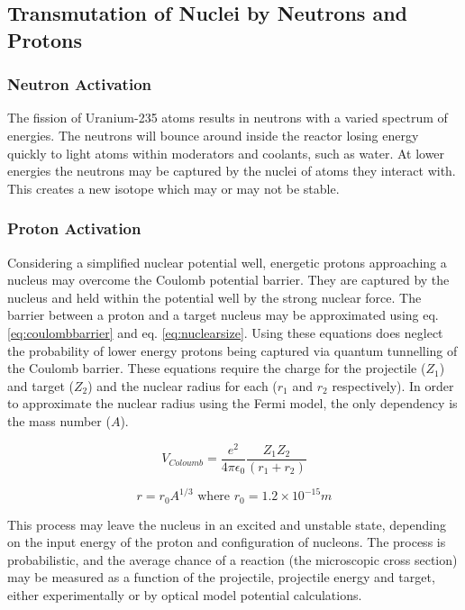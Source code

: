 \subsection{Transmutation of Nuclei by Neutrons and Protons}

\subsubsection{Neutron Activation}

The fission of Uranium-235 atoms results in neutrons with a varied spectrum of energies.  The neutrons will bounce around inside the reactor losing energy quickly to light atoms within moderators and coolants, such as water.  At lower energies the neutrons may be captured by the nuclei of atoms they interact with.  This creates a new isotope which may or may not be stable.



\subsubsection{Proton Activation}
\label{section:protonactivation}

Considering a simplified nuclear potential well, energetic protons approaching a nucleus may overcome the Coulomb potential barrier.  They are captured by the nucleus and held within the potential well by the strong nuclear force.  The barrier between a proton and a target nucleus may be approximated using eq. \ref{eq:coulombbarrier}\cite{coulombhyperphysics} and eq. \ref{eq:nuclearsize}\cite{nuclearsizehyperphysics}.  Using these equations does neglect the probability of lower energy protons being captured via quantum tunnelling of the Coulomb barrier.  These equations require the charge for the projectile ($Z_1$) and target ($Z_2$) and the nuclear radius for each ($r_1$ and $r_2$ respectively).  In order to approximate the nuclear radius using the Fermi model, the only dependency is the mass number ($A$).

\begin{equation}
V_{Coloumb} = \frac{e^2}{4 \pi \epsilon_{0}} \frac{Z_1 Z_2}{(r_{1} + r_{2})}
\label{eq:coulombbarrier}
\end{equation}

\begin{equation}
r = r_{0} A^{1/3} \text{       where } r_0 = 1.2 \times 10^{-15}m
\label{eq:nuclearsize}
\end{equation}

This process may leave the nucleus in an excited and unstable state, depending on the input energy of the proton and configuration of nucleons.  The process is probabilistic, and the average chance of a reaction (the microscopic cross section) may be measured as a function of the projectile, projectile energy and target, either experimentally or by optical model potential calculations.  

